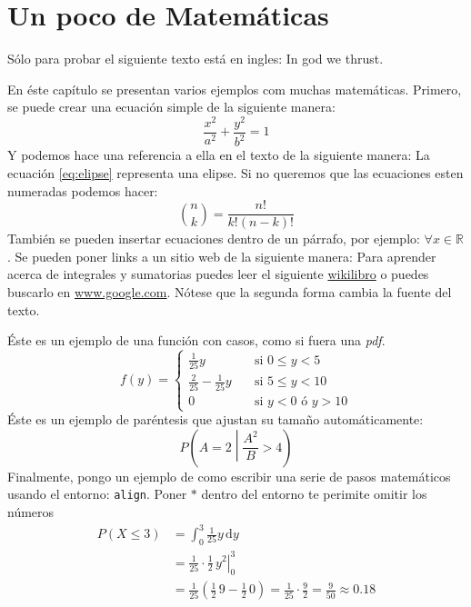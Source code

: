 \chapter{Un poco de Matemáticas}
\label{chap:mate}
Sólo para probar el siguiente texto está en ingles: \textenglish{In god we thrust}.

En éste capítulo se presentan varios ejemplos com muchas matemáticas. 
Primero, se puede crear una ecuación simple de la siguiente manera:
\begin{equation}
 \label{eq:elipse}
 \frac{x^{2}}{a^{2}} + \frac{y^{2}}{b^{2}} = 1
\end{equation}
Y podemos hace una referencia a ella en el texto de la siguiente manera: La  ecuación \eqref{eq:elipse} representa una elipse.
Si no queremos que las ecuaciones esten numeradas podemos hacer:
\begin{equation}
 \nonumber
 \binom{n}{k} = \frac{n!}{k!(n-k)!} 
\end{equation}
También se pueden insertar ecuaciones dentro de un párrafo, por ejemplo: $\forall x \in \mathbb{R}$. 
Se pueden poner links a un sitio web de la siguiente manera: 
Para aprender acerca de integrales y sumatorias puedes leer el siguiente \href{https://en.wikibooks.org/wiki/LaTeX/Mathematics#Sums_and_integrals}{wikilibro} o puedes buscarlo en \url{www.google.com}.
Nótese que la segunda forma cambia la fuente del texto.
 
Éste es un ejemplo de una función con casos, como si fuera una \emph{pdf}.
\begin{equation}
 \label{eq:pdf}
 f(y) =
 \begin{cases}
   \frac{1}{25} y & \quad \text{si } 0 \leq y < 5 \\
   \frac{2}{25} - \frac{1}{25} y & \quad \text{si } 5 \leq y < 10 \\
   0 & \quad \text{si } y < 0 \text{ ó } y > 10
 \end{cases}
\end{equation}
Éste es un ejemplo de paréntesis que ajustan su tamaño automáticamente:
\begin{equation}
 \nonumber
 P\left(A=2\middle|\frac{A^2}{B}>4\right)
\end{equation}
Finalmente, pongo un ejemplo de como escribir una serie de pasos matemáticos usando el entorno: \verb|align|.
Poner $*$ dentro del entorno te perimite omitir los números
\begin{align*}
P\left(X \leq 3 \right) &= \int_{0}^{3} \frac{1}{25} y \,\mathrm{d}y \\
     &= \left. \frac{1}{25} \cdot \frac{1}{2} \, y^{2} \right|_0^3 \\
     &= \frac{1}{25} \left( \frac{1}{2} \, 9 - \frac{1}{2} \, 0 \right) =
     \frac{1}{25} \cdot \frac{9}{2} = \frac{9}{50} \approx 0.18 
\end{align*}

